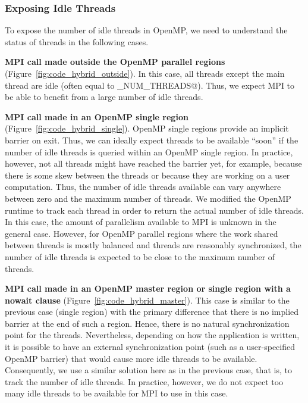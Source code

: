 \vspace{-1.0ex}
\subsubsection{Exposing Idle Threads}

To expose the number of idle threads in OpenMP, we need to understand
the status of threads in the following cases.

\vspace{1.0ex}
\noindent\textbf{MPI call made outside the OpenMP parallel regions}
(Figure~\ref{fig:code_hybrid_outside}).  In this case, all threads
except the main thread are idle (often equal to
\verb@OMP_NUM_THREADS@).  Thus, we expect MPI to be able
to benefit from a large number of idle threads.

\vspace{1.0ex}
\noindent\textbf{MPI call made in an OpenMP single region}
(Figure~\ref{fig:code_hybrid_single}).  OpenMP single regions provide
an implicit barrier on exit.  Thus, we can ideally expect threads to
be available ``soon'' if the number of idle threads is queried within
an OpenMP single region.  In practice, however, not all threads might
have reached the barrier yet, for example, because there is some skew
between the threads or because they are working on a user computation.
Thus, the number of idle threads available can vary anywhere between
zero and the maximum number of threads.  We modified the OpenMP
runtime to track each thread in order to return the actual number of
idle threads.  In this case, the amount of parallelism available to
MPI is unknown in the general case.  However, for OpenMP parallel
regions where the work shared between threads is mostly balanced and
threads are reasonably synchronized, the number of idle threads is
expected to be close to the maximum number of threads.

\vspace{1.0ex}
\noindent\textbf{MPI call made in an OpenMP master region or single
  region with a nowait clause} (Figure~\ref{fig:code_hybrid_master}).
This case is similar to the previous case (single region) with the
primary difference that there is no implied barrier at the end of such
a region.  Hence, there is no natural
synchronization point for the threads.  Nevertheless, depending on how
the application is written, it is possible to have an external
synchronization point (such as a user-specified OpenMP barrier) that
would cause more idle threads to be available.  Consequently, we use a
similar solution here as in the previous case, that is, to track the
number of idle threads.  In practice, however, we do not expect too
many idle threads to be available for MPI to use in this case.


